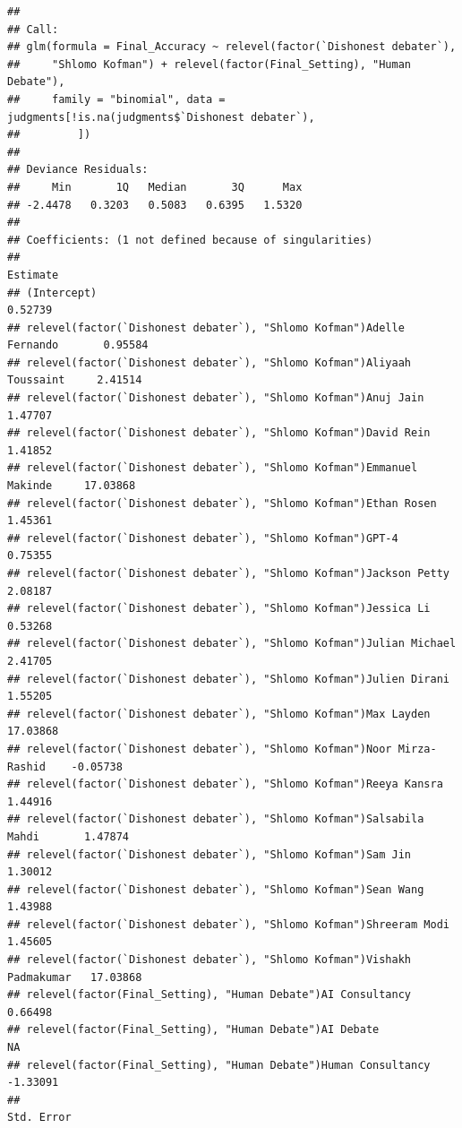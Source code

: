 \documentclass[
]{article}
\begin{document}
\begin{verbatim}
## 
## Call:
## glm(formula = Final_Accuracy ~ relevel(factor(`Dishonest debater`), 
##     "Shlomo Kofman") + relevel(factor(Final_Setting), "Human Debate"), 
##     family = "binomial", data = judgments[!is.na(judgments$`Dishonest debater`), 
##         ])
## 
## Deviance Residuals: 
##     Min       1Q   Median       3Q      Max  
## -2.4478   0.3203   0.5083   0.6395   1.5320  
## 
## Coefficients: (1 not defined because of singularities)
##                                                                           Estimate
## (Intercept)                                                                0.52739
## relevel(factor(`Dishonest debater`), "Shlomo Kofman")Adelle Fernando       0.95584
## relevel(factor(`Dishonest debater`), "Shlomo Kofman")Aliyaah Toussaint     2.41514
## relevel(factor(`Dishonest debater`), "Shlomo Kofman")Anuj Jain             1.47707
## relevel(factor(`Dishonest debater`), "Shlomo Kofman")David Rein            1.41852
## relevel(factor(`Dishonest debater`), "Shlomo Kofman")Emmanuel Makinde     17.03868
## relevel(factor(`Dishonest debater`), "Shlomo Kofman")Ethan Rosen           1.45361
## relevel(factor(`Dishonest debater`), "Shlomo Kofman")GPT-4                 0.75355
## relevel(factor(`Dishonest debater`), "Shlomo Kofman")Jackson Petty         2.08187
## relevel(factor(`Dishonest debater`), "Shlomo Kofman")Jessica Li            0.53268
## relevel(factor(`Dishonest debater`), "Shlomo Kofman")Julian Michael        2.41705
## relevel(factor(`Dishonest debater`), "Shlomo Kofman")Julien Dirani         1.55205
## relevel(factor(`Dishonest debater`), "Shlomo Kofman")Max Layden           17.03868
## relevel(factor(`Dishonest debater`), "Shlomo Kofman")Noor Mirza-Rashid    -0.05738
## relevel(factor(`Dishonest debater`), "Shlomo Kofman")Reeya Kansra          1.44916
## relevel(factor(`Dishonest debater`), "Shlomo Kofman")Salsabila Mahdi       1.47874
## relevel(factor(`Dishonest debater`), "Shlomo Kofman")Sam Jin               1.30012
## relevel(factor(`Dishonest debater`), "Shlomo Kofman")Sean Wang             1.43988
## relevel(factor(`Dishonest debater`), "Shlomo Kofman")Shreeram Modi         1.45605
## relevel(factor(`Dishonest debater`), "Shlomo Kofman")Vishakh Padmakumar   17.03868
## relevel(factor(Final_Setting), "Human Debate")AI Consultancy               0.66498
## relevel(factor(Final_Setting), "Human Debate")AI Debate                         NA
## relevel(factor(Final_Setting), "Human Debate")Human Consultancy           -1.33091
##                                                                         Std. Error

\end{verbatim}
\end{document}

